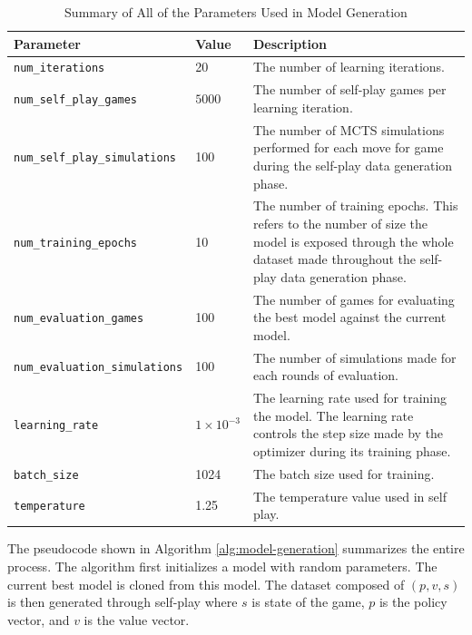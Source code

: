 \begin{table}[htb]
  \centering
  \begin{tabular}{llp{7.5cm}}
    \hline 
    Parameter                         & Value              & Description                                                                  \\ \hline
    \verb|num_iterations|             & 20                 & The number of learning iterations.                                           \\
    \verb|num_self_play_games|        & $5000$             & The number of self-play games per learning iteration.                         \\
    \verb|num_self_play_simulations|  & 100                & The number of MCTS simulations performed for each move for game during the self-play data generation phase.           \\
    \verb|num_training_epochs|        & 10                 & The number of training epochs. This refers to the number of size the model is exposed through the whole dataset made throughout the self-play data generation phase.                                              \\
    \verb|num_evaluation_games|       & 100                & The number of games for evaluating the best model against the current model. \\
    \verb|num_evaluation_simulations| & 100                & The number of simulations made for each rounds of evaluation.                \\
    \verb|learning_rate|              & $1 \times 10^{-3}$ & The learning rate used for training the model. The learning rate controls the step size made by the optimizer during its training phase.  \\
    \verb|batch_size|                 & 1024               & The batch size used for training.                                            \\
    \verb|temperature|                & 1.25               & The temperature value used in self play.                                     \\ \hline
  \end{tabular}
  \caption{Summary of All of the Parameters Used in Model Generation}
  \label{tab:configuration-summary}
\end{table}

The pseudocode shown in Algorithm \ref{alg:model-generation} summarizes the entire process. 
The algorithm first initializes a model with random parameters. The current best model is cloned from this model. The dataset composed of $(p, v, s)$ is then generated through self-play where $s$ is state of the game, $p$ is the policy vector, and $v$ is the value vector.

